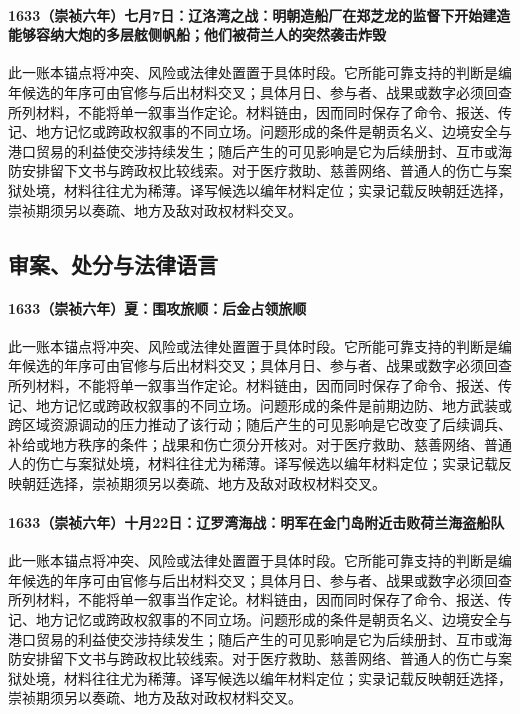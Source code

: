 \paragraph{1633（崇祯六年）七月7日：辽洛湾之战：明朝造船厂在郑芝龙的监督下开始建造能够容纳大炮的多层舷侧帆船；他们被荷兰人的突然袭击炸毁} 此一账本锚点将冲突、风险或法律处置置于具体时段。它所能可靠支持的判断是编年候选的年序可由官修与后出材料交叉；具体月日、参与者、战果或数字必须回查所列材料，不能将单一叙事当作定论。材料链由，因而同时保存了命令、报送、传记、地方记忆或跨政权叙事的不同立场。问题形成的条件是朝贡名义、边境安全与港口贸易的利益使交涉持续发生；随后产生的可见影响是它为后续册封、互市或海防安排留下文书与跨政权比较线索。对于医疗救助、慈善网络、普通人的伤亡与案狱处境，材料往往尤为稀薄。译写候选以编年材料定位；实录记载反映朝廷选择，崇祯期须另以奏疏、地方及敌对政权材料交叉。

\subsection{审案、处分与法律语言}

\paragraph{1633（崇祯六年）夏：围攻旅顺：后金占领旅顺} 此一账本锚点将冲突、风险或法律处置置于具体时段。它所能可靠支持的判断是编年候选的年序可由官修与后出材料交叉；具体月日、参与者、战果或数字必须回查所列材料，不能将单一叙事当作定论。材料链由，因而同时保存了命令、报送、传记、地方记忆或跨政权叙事的不同立场。问题形成的条件是前期边防、地方武装或跨区域资源调动的压力推动了该行动；随后产生的可见影响是它改变了后续调兵、补给或地方秩序的条件；战果和伤亡须分开核对。对于医疗救助、慈善网络、普通人的伤亡与案狱处境，材料往往尤为稀薄。译写候选以编年材料定位；实录记载反映朝廷选择，崇祯期须另以奏疏、地方及敌对政权材料交叉。

\paragraph{1633（崇祯六年）十月22日：辽罗湾海战：明军在金门岛附近击败荷兰海盗船队} 此一账本锚点将冲突、风险或法律处置置于具体时段。它所能可靠支持的判断是编年候选的年序可由官修与后出材料交叉；具体月日、参与者、战果或数字必须回查所列材料，不能将单一叙事当作定论。材料链由，因而同时保存了命令、报送、传记、地方记忆或跨政权叙事的不同立场。问题形成的条件是朝贡名义、边境安全与港口贸易的利益使交涉持续发生；随后产生的可见影响是它为后续册封、互市或海防安排留下文书与跨政权比较线索。对于医疗救助、慈善网络、普通人的伤亡与案狱处境，材料往往尤为稀薄。译写候选以编年材料定位；实录记载反映朝廷选择，崇祯期须另以奏疏、地方及敌对政权材料交叉。

